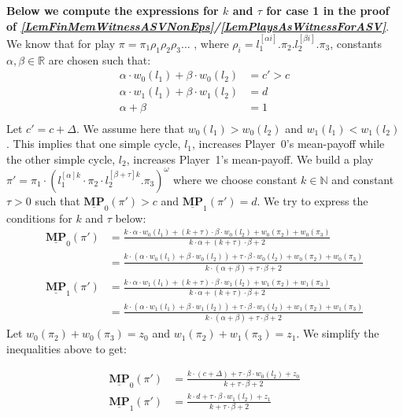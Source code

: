 \textbf{Below we compute the expressions for $k$ and $\tau$ for \textbf{case 1} in the proof of \textit{\cref{LemFinMemWitnessASVNonEps}/\cref{LemPlaysAsWitnessForASV}}}.
We know that for play $\pi = \pi_1\rho_1\rho_2\rho_3\dots$ , where $\rho_i = l_1^{[\alpha i]}.\pi_2.l_2^{[\beta i]}.\pi_3$, constants $\alpha, \beta \in \mathbb{R}$ are chosen such that: 
\begin{align*}
    \alpha \cdot w_0(l_1) + \beta \cdot w_0(l_2) &= c' > c \\
    \alpha \cdot w_1(l_1) + \beta \cdot w_1(l_2) &= d \\
    \alpha + \beta &= 1 \\
\end{align*}
Let $c' = c + \Delta$. We assume here that $w_0(l_1) > w_0(l_2)$ and $w_1(l_1) < w_1(l_2)$. This implies that one simple cycle, $l_1$, increases Player~0's mean-payoff while the other simple cycle, $l_2$, increases Player~1's mean-payoff. We build a play $\pi' = \pi_1 \cdot (l_1^{[\alpha]k} \cdot \pi_2 \cdot l_2^{[\beta+\tau]k}.\pi_3)^{\omega}$ where we choose constant $k \in \mathbb{N}$ and constant $\tau > 0$ such that $\underline{\mathbf{MP}}_0(\pi') > c$ and $\underline{\mathbf{MP}}_1(\pi') = d$. We try to express the conditions for $k$ and $\tau$ below:
\begin{align*}
    \underline{\mathbf{MP}}_0(\pi') &= \frac{k\cdot\alpha\cdot w_0(l_1) + (k + \tau) \cdot \beta \cdot w_0(l_2) + w_0(\pi_2) + w_0(\pi_3)}{k\cdot\alpha + (k+\tau)\cdot\beta + 2}\\
    &= \frac{k\cdot(\alpha\cdot w_0(l_1) + \beta \cdot w_0(l_2)) + \tau \cdot \beta \cdot w_0(l_2) + w_0(\pi_2) + w_0(\pi_3)}{k\cdot(\alpha + \beta) + \tau\cdot\beta + 2}\\
    \underline{\mathbf{MP}}_1(\pi') &= \frac{k\cdot\alpha\cdot w_1(l_1) + (k + \tau) \cdot \beta \cdot w_1(l_2) + w_1(\pi_2) + w_1(\pi_3)}{k\cdot\alpha + (k+\tau)\cdot\beta + 2}\\
    &= \frac{k\cdot(\alpha\cdot w_1(l_1) + \beta \cdot w_1(l_2)) + \tau \cdot \beta \cdot w_1(l_2) + w_1(\pi_2) + w_1(\pi_3)}{k\cdot(\alpha + \beta) + \tau\cdot\beta + 2}
\end{align*}
Let $w_0(\pi_2) + w_0(\pi_3) = z_0$ and $w_1(\pi_2) + w_1(\pi_3) = z_1$. We simplify the inequalities above to get:

\begin{align*}
    \underline{\mathbf{MP}}_0(\pi') &= \frac{k\cdot(c+\Delta) + \tau \cdot \beta \cdot w_0(l_2) + z_0}{k + \tau\cdot\beta + 2}\\
    \underline{\mathbf{MP}}_1(\pi') &= \frac{k\cdot d + \tau \cdot \beta \cdot w_1(l_2) + z_1}{k + \tau\cdot\beta + 2}
\end{align*}

